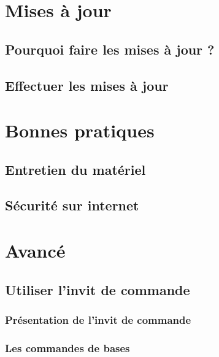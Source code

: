 \documentclass[12pt]{book}
\begin{document}
\chapter{Mises à jour}\label{sec:maj}
	\section{Pourquoi faire les mises à jour ?}
	\section{Effectuer les mises à jour}

\chapter{Bonnes pratiques}
	\section{Entretien du matériel}
	\section{Sécurité sur internet}

\chapter{Avancé}
\section{Utiliser l'invit de commande}\label{sec:utiliserterminal}
	\subsection{Présentation de l'invit de commande}
	\subsection{Les commandes de bases}
\end{document}
